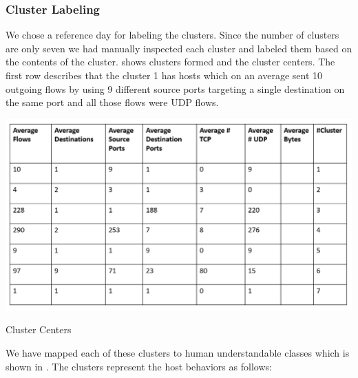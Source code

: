 \subsubsection*{Cluster Labeling}

We chose a reference day for labeling the clusters. Since the number of clusters are only seven we had manually inspected each cluster and labeled them based on the contents of the cluster.  shows clusters formed and the cluster centers. The first row describes that the cluster 1 has hosts which on an average sent 10 outgoing flows by using 9 different source ports targeting a single destination on the same port and all those flows were UDP flows. 

\begin{table}[ht]
	\centerline{\includegraphics[scale = 0.6]{cluster_centers.png}}
	\caption{Cluster Centers}%
\end{table}

We have mapped each of these clusters to human understandable classes which is shown in . The clusters represent the host behaviors as follows:

